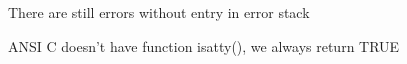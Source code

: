
\begin{DoxyRefList}
\item[\label{bug__bug000001}%
\hypertarget{bug__bug000001}{}%
Group \hyperlink{group__errors}{errors} ]There are still errors without entry in error stack 
\item[\label{bug__bug000002}%
\hypertarget{bug__bug000002}{}%
Global \hyperlink{group__utilities_ga9a90e738d03b642f33901600671d225a}{Is\-A\-Terminal} (F\-I\-L\-E $\ast$fp)]A\-N\-S\-I C doesn't have function isatty(), we always return T\-R\-U\-E
\end{DoxyRefList}